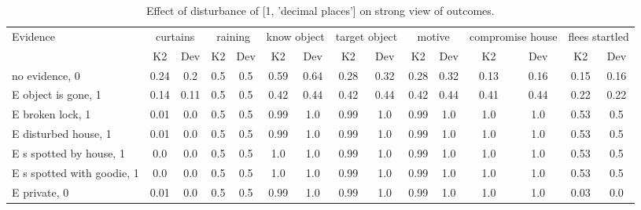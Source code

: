 \begin{table}\begin{tabular}{l|cc|cc|cc|cc|cc|cc|cc}\toprule\multirow{2}{*}{Evidence} & \multicolumn{2}{c}{curtains}& \multicolumn{2}{c}{raining}& \multicolumn{2}{c}{know object}& \multicolumn{2}{c}{target object}& \multicolumn{2}{c}{motive}& \multicolumn{2}{c}{compromise house}& \multicolumn{2}{c}{flees startled}\\& {K2} & {Dev}& {K2} & {Dev}& {K2} & {Dev}& {K2} & {Dev}& {K2} & {Dev}& {K2} & {Dev}& {K2} & {Dev}\\\midrule
no evidence, 0 & 0.24&0.2&0.5&0.5&\cellcolor{Bittersweet}0.59&\cellcolor{Bittersweet}0.64&0.28&0.32&0.28&0.32&0.13&0.16&0.15&0.16\\E object is gone, 1 & 0.14&0.11&0.5&0.5&0.42&0.44&0.42&0.44&0.42&0.44&0.41&0.44&0.22&0.22\\E broken lock, 1 & 0.01&0.0&0.5&0.5&0.99&1.0&0.99&1.0&0.99&1.0&1.0&1.0&0.53&0.5\\E disturbed house, 1 & 0.01&0.0&0.5&0.5&0.99&1.0&0.99&1.0&0.99&1.0&1.0&1.0&0.53&0.5\\E s spotted by house, 1 & 0.0&0.0&0.5&0.5&1.0&1.0&0.99&1.0&0.99&1.0&1.0&1.0&0.53&0.5\\E s spotted with goodie, 1 & 0.0&0.0&0.5&0.5&1.0&1.0&0.99&1.0&0.99&1.0&1.0&1.0&0.53&0.5\\E private, 0 & 0.01&0.0&0.5&0.5&0.99&1.0&0.99&1.0&0.99&1.0&1.0&1.0&0.03&0.0\\\bottomrule\end{tabular}\caption{Effect of disturbance of [1, 'decimal places'] on strong view of outcomes.}\end{table}